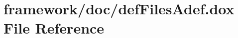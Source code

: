 \hypertarget{def_files_adef_8dox}{}\section{framework/doc/def\+Files\+Adef.dox File Reference}
\label{def_files_adef_8dox}
